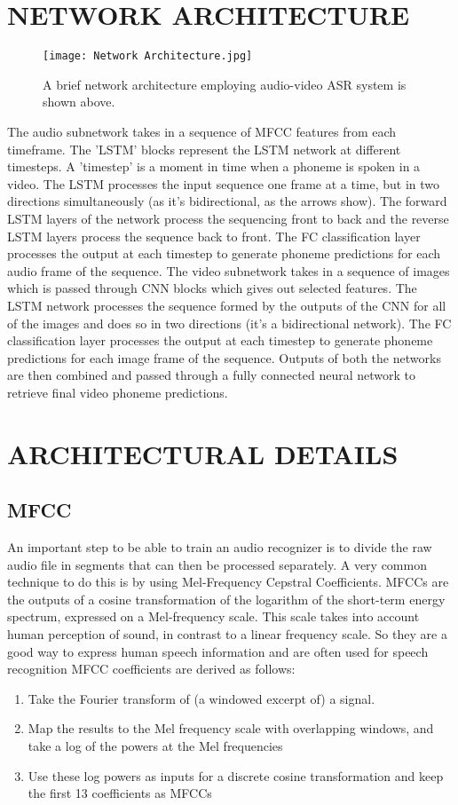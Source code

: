 \documentclass{article}
\begin{document}
\section{NETWORK ARCHITECTURE}
\begin{figure}
\centering
\texttt{[image: Network Architecture.jpg]}
\caption{\label{fig:Network Architecture}A brief network architecture employing audio-video ASR system is shown above.}
\end{figure}

The audio subnetwork takes in a sequence of MFCC features from each timeframe. The ’LSTM’ blocks represent the LSTM network at different timesteps. A ’timestep’ is a moment in time when a phoneme is spoken in a video. The LSTM processes the input sequence one frame at a time, but in two directions simultaneously (as it’s bidirectional, as the arrows show). The forward LSTM layers of the network process the sequencing front to back and the reverse LSTM layers process the sequence back to front. The FC classification layer processes the output at each timestep to generate phoneme predictions for each audio frame of the sequence. 
The video subnetwork takes in a sequence of images which is passed through CNN blocks which gives out selected features. The LSTM network processes the sequence formed by the outputs of the CNN for all of the images and does so in two directions (it’s a bidirectional network). The FC classification layer processes the output at each timestep to generate phoneme predictions for each image frame of the sequence. Outputs of both the networks are then combined and passed through a fully connected neural network to retrieve final video phoneme predictions.


\section{ARCHITECTURAL DETAILS}
\subsection{MFCC}
An important step to be able to train an audio recognizer is to divide the raw audio file in segments that can then be processed separately. A very common technique to do this is by using Mel-Frequency Cepstral Coefficients. MFCCs are the outputs of a cosine transformation of the logarithm of the short-term energy spectrum, expressed on a Mel-frequency scale. This scale takes into account human perception of sound, in contrast to a linear frequency scale. So they are a good way to express human speech information and are often used for speech recognition
MFCC coefficients are derived as follows:
\begin{enumerate}
\item Take the Fourier transform of (a windowed excerpt of) a signal.
\item Map the results to the Mel frequency scale with overlapping windows, and take a log of the powers at the Mel frequencies
\item Use these log powers as inputs for a discrete cosine transformation and keep the first 13 coefficients as MFCCs
\end{enumerate}
\end{document}
